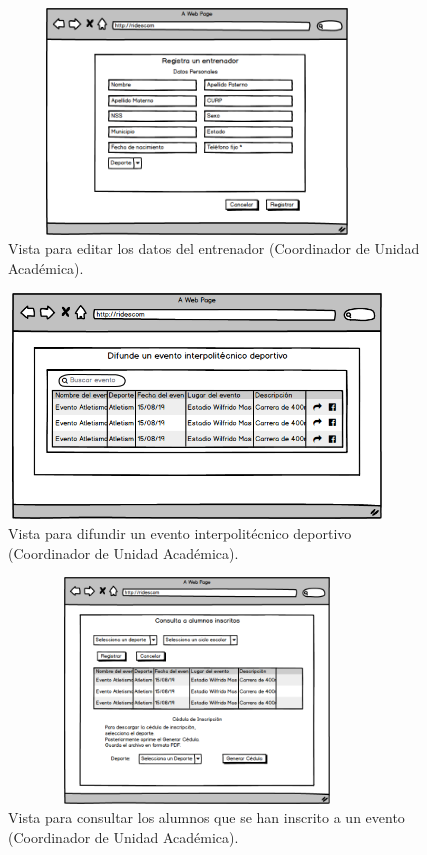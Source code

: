 		\begin{figure} [hbt!]
			\centering
			\includegraphics[width=10cm, height=6cm]{Imagenes/Nuevos/P13_Editar_entrenador}
			\caption{Vista para editar los datos del entrenador (Coordinador de Unidad Académica).}
			\label{editarentrenador}
		\end{figure}
		
		\begin{figure} [hbt!]
			\centering
			\includegraphics[width=10cm, height=6cm]{Imagenes/Nuevos/P14_Difundir_evento}
			\caption{Vista para difundir un evento interpolitécnico deportivo (Coordinador de Unidad Académica).}
			\label{difundirevento}
		\end{figure}
		\pagebreak

		\begin{figure} [hbt!]
			\centering
			\includegraphics[width=10cm, height=6cm]{Imagenes/Nuevos/P15_Consulta_alumnos_inscritos}
			\caption{Vista para consultar los alumnos que se han inscrito a un evento (Coordinador de Unidad Académica).}
			\label{consultaalumnosinscritos}
		\end{figure}
	
